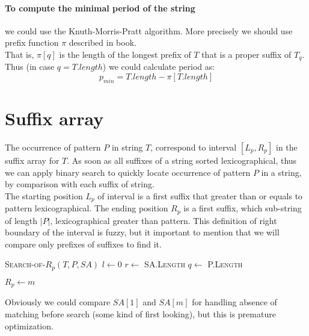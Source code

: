 \documentclass{article}
\let\oldnl\nl
\newcommand{\nonl}{\renewcommand{\nl}{\let\nl\oldnl}}
\begin{document}
\paragraph{To compute the minimal period of the string}
we could use the Knuth-Morris-Pratt algorithm. More precisely we should
use prefix function $\pi$ described in book\cite[p.1003]{introtoalg}. \\

That is, $\pi[q]$ is the length of the longest prefix of $T$ that is a proper
suffix of $T_q$. Thus (in case $q = T.length$) we could calculate period as:\\

$$ p_{min} = T.length - \pi[T.length] $$

\section{Suffix array}

The occurrence of pattern $P$ in string $T$, correspond to interval $[L_p, R_p]$
in the suffix array for $T$. As soon as all suffixes of a string sorted
lexicographical, thus we can apply binary search to quickly locate occurrence of
pattern $P$ in a string, by comparison with each suffix of string.\\

The starting position $L_p$ of interval is a first suffix that greater than or
equals to pattern lexicographical. The ending position $R_p$ is a first suffix,
which sub-string of length $|P|$, lexicographical greater than pattern. This
definition of right boundary of the interval is fuzzy, but it important to
mention that we will compare only prefixes of suffixes to find it.\\

\IncMargin{1em}
\begin{algorithm}[H]
  \SetAlgoNoEnd\SetAlgoNoLine
  \SetNlSkip{1.5em}
  \DontPrintSemicolon

  \nonl \textsc{Search-of-$R_p$}$(T, P, SA)$\;
  $l \leftarrow 0$\;
  $r \leftarrow $ \textsc{SA.Length}{\color{Gray}}
  $q \leftarrow $ \textsc{P.Length}\;

  \Return $R_p \leftarrow m$
\end{algorithm}

Obviously we could compare $SA[1]$ and $SA[m]$ for handling absence of matching
before search (some kind of first looking), but this is premature optimization.\\
\end{document}
